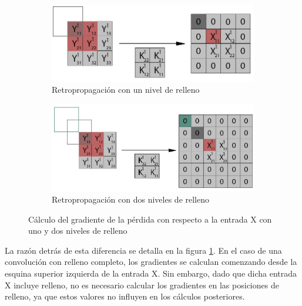 \begin{figure}[H]
	\centering
	\begin{subfigure}{.5\textwidth}
		\includegraphics[width=1.4\linewidth]{imagenes/full_vs_normal_conv_1.jpg}  
		\caption{Retropropagación con un nivel de relleno}
	\end{subfigure}
	
	\vspace{5mm}
	\begin{subfigure}{.5\textwidth}
		\includegraphics[width=1.4\linewidth]{imagenes/full_vs_normal_conv_2.jpg}  
		\caption{Retropropagación con dos niveles de relleno}
	\end{subfigure}
	\caption{Cálculo del gradiente de la pérdida con respecto a la entrada X con uno y dos niveles de relleno}
	\label{fig:conv_full_vs_normal}
\end{figure}

La razón detrás de esta diferencia se detalla en la figura \ref{fig:conv_full_vs_normal}. En el caso de una convolución con relleno completo, los gradientes se calculan comenzando desde la esquina superior izquierda de la entrada X. Sin embargo, dado que dicha entrada X incluye relleno, no es necesario calcular los gradientes en las posiciones de relleno, ya que estos valores no influyen en los cálculos posteriores.
